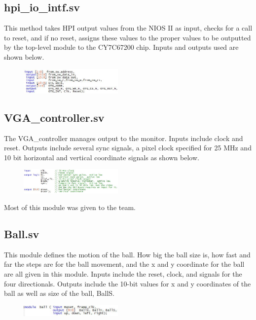\documentclass[journal, twocolumn, final,11pt,letterpaper]{IEEEtran}
\begin{document}
\subsection{hpi\_io\_intf.sv}
This method takes HPI output values from the NIOS II as input, checks for a call to reset, and if no reset, assigns these values to the proper values to be outputted by the top-level module to the CY7C67200 chip.  Inputs and outputs used are shown below.

\begin{figure}[h]
	\centering
	\includegraphics[width=0.45\textwidth]{hpiio.jpg}
	\label{fig:hpiio}
\end{figure}



\subsection{VGA\_controller.sv}
The VGA\_controller manages output to the monitor.  Inputs include clock and reset. Outputs include several sync signals, a pixel clock specified for 25 MHz and 10 bit horizontal and vertical coordinate signals as shown below.

\begin{figure}[h]
	\centering
	\includegraphics[width=0.45\textwidth]{VGAio.jpg}
	\label{fig:VGAio}
\end{figure}

Most of this module was given to the team.


\subsection{Ball.sv}
This module defines the motion of the ball.  How big the ball size is, how fast and far the steps are for the ball movement, and the x and y coordinate for the ball are all given in this module.  Inputs include the reset, clock, and signals for the four directionals.  Outputs include the 10-bit values for x and y coordinates of the ball as well as size of the ball, BallS.  
  
\begin{figure}[h]
	\centering
	\includegraphics[width=0.45\textwidth]{ballio.jpg}
	\label{fig:ballio}
\end{figure}
\end{document}
